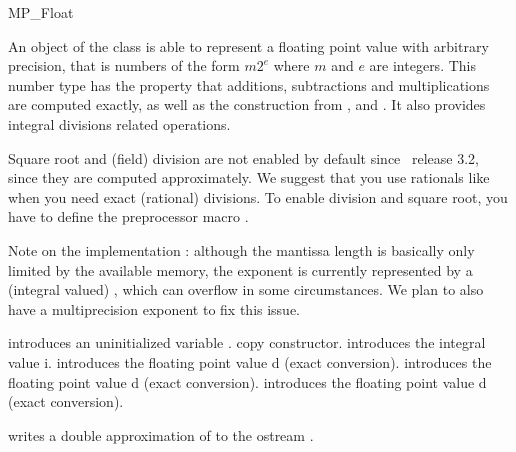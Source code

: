 
\begin{ccRefClass} {MP_Float}

\ccDefinition
An object of the class  is able to represent a floating point
value with arbitrary precision, that is numbers of the form $m2^e$ where
$m$ and $e$ are integers.  This number type has the property that
additions, subtractions and multiplications are computed exactly, as well as
the construction from ,  and .
It also provides integral divisions related operations.

Square root and (field) division are not enabled by default since
\cgal\ release 3.2, since they are computed approximately.  We suggest that you
use rationals like  when you need exact (rational)
divisions.  To enable division and square root, you have to define the
preprocessor macro .

Note on the implementation : although the mantissa length is basically only
limited by the available memory, the exponent is currently represented by a
(integral valued) , which can overflow in some circumstances.  We
plan to also have a multiprecision exponent to fix this issue.


\ccIsModel
{}

\ccCreation
{}

{introduces an uninitialized variable \ccVar.}
\ccGlue
{}
{copy constructor.}
\ccGlue
{}
{introduces the integral value i.}
\ccGlue
{}
{introduces the floating point value d (exact conversion).}
\ccGlue
{}
{introduces the floating point value d (exact conversion).}
\ccGlue
{}
{introduces the floating point value d (exact conversion).}

\ccOperations

{writes a double approximation of  to the ostream .}


\end{ccRefClass}
